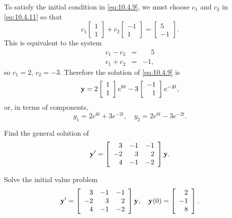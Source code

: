 \begin{examplesolution}
 To satisfy the initial condition in \eqref{eq:10.4.9}, we must choose $c_{1}$ and
$c_{2}$ in \eqref{eq:10.4.11} so that
\[
  c_{1}\left[
  \begin{array}{r}
    1 \\
    1
  \end{array}\right]+c_{2}\left[
  \begin{array}{r}
    -1 \\
    1
  \end{array}\right]=\left[
  \begin{array}{r}
    5  \\
    -1
  \end{array}\right].
\]
This is equivalent to the system
\begin{eqnarray*}
  c_{1}-c_{2} & = & \phantom{-}5 \\
  c_{1}+c_{2} & = & -1,
\end{eqnarray*}
so $c_{1}=2$, $c_{2}=-3$. Therefore the solution of \eqref{eq:10.4.9} is
\[
  {\bf y}=2\left[
  \begin{array}{r}
    1 \\
    1
  \end{array}\right]e^{6t}-3 \left[
  \begin{array}{r}
    -1 \\
    1
  \end{array}\right]e^{-2t},
\]
or, in terms of components,
\[
  y_{1}=2e^{6t}+3e^{-2t},\quad y_{2}=2e^{6t}-3e^{-2t}.
\]
\end{examplesolution}

\begin{example}
  \label{example:10.4.2} \rm \mbox{}
  \newline
  \begin{alist}
    \item %
    Find the general solution of
    \begin{equation}
      \label{eq:10.4.12}{\bf y}'=\left[
      \begin{array}{rrr}
        3  & -1 & -1 \\
        -2 & 3  & 2  \\
        4  & -1 & -2
      \end{array}\right]{\bf y}.
    \end{equation}

    \item %
    Solve the initial value problem
    \begin{equation}
      \label{eq:10.4.13}{\bf y}'=\left[
      \begin{array}{rrr}
        3  & -1 & -1 \\
        -2 & 3  & 2  \\
        4  & -1 & -2
      \end{array}
      \right]{\bf y},\quad{\bf y}(0)=\left[
      \begin{array}{r}
        2  \\
        -1 \\
        8
      \end{array}\right].
    \end{equation}
  \end{alist}
\end{example}


